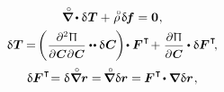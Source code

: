 \nopagebreak\vspace{-0.4em}
\begin{equation}\label{variationsforthecurrentconfiguration}
\begin{array}{c}
\boldnablacircled \hspace{-0.1ex} \dotp \variation{\hspace{.1ex}\firstpiolakirchhoffstress}
+ \hspace{.1ex} \mathcircabove{\rho} \hspace{.25ex} \variation{\hspace{-0.2ex}\massloadvector}
= \zerovector
\hspace{.1ex} ,
\\[.4em]
%
\variation{\hspace{.1ex}\firstpiolakirchhoffstress} \hspace{-0.1ex}
= \hspace{-0.3ex} \biggl( \hspace{.1ex} \scalebox{.93}{$ \displaystyle\frac{\partial^2 \hspace{.1ex} \potentialenergydensity}{\raisemath{-0.1em}{\partial \hspace{.1ex} \bm{C} \hspace{.1ex} \partial \hspace{.1ex} \bm{C}}} $} \dotdotp \variation{\hspace{.1ex}\bm{C}} \hspace{-0.15ex} \biggr) \hspace{-0.3ex} \dotp \bm{F}^{\hspace{.1ex}\T} \hspace{-0.3ex}
+ \hspace{.1ex}
\scalebox{.93}{$ \displaystyle\frac{\partial \hspace{.1ex} \potentialenergydensity}{\raisemath{-0.1em}{\partial \hspace{.1ex} \bm{C}}} $} \dotp \variation{\bm{F}}^{\hspace{.1ex}\T}
\hspace{-0.4ex} ,
\\[1.2em]
%
\variation{\bm{F}}^{\hspace{.1ex}\T} \hspace{-0.5ex}
= \variation{\hspace{.1ex} \boldnablacircled \currentlocationvector}
= \hspace{-0.2ex} \boldnablacircled \hspace{.1ex} \variation{\currentlocationvector}
= \hspace{-0.1ex} \bm{F}^{\hspace{.1ex}\T} \hspace{-0.25ex} \dotp \boldnabla \hspace{.1ex} \variation{\currentlocationvector} \hspace{.15ex} ,

\end{array}
\end{equation}
